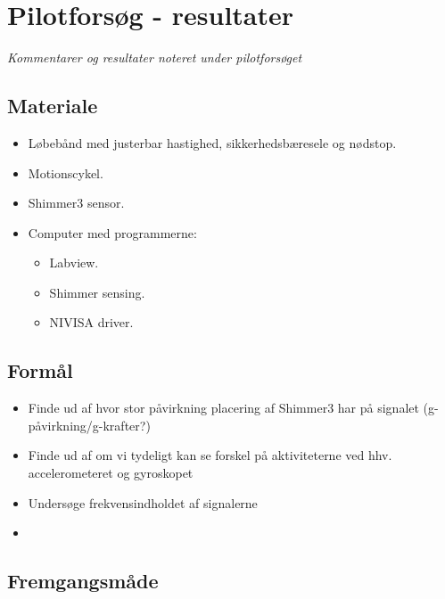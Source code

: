 \section{Pilotforsøg - resultater}\vspace{-.75cm}
\textit{Kommentarer og resultater noteret under pilotforsøget}

\subsection{Materiale}
\begin{itemize}
	\item Løbebånd med justerbar hastighed, sikkerhedsbæresele og nødstop.
	\item Motionscykel.
	\item Shimmer3 sensor.
	\item Computer med programmerne:
	\begin{itemize}
		\item Labview.
		\item Shimmer sensing.
		\item NIVISA driver.
	\end{itemize}
\end{itemize}


\subsection{Formål}

\begin{itemize}
	\item Finde ud af hvor stor påvirkning placering af Shimmer3 har på signalet (g-påvirkning/g-krafter?)
	\item Finde ud af om vi tydeligt kan se forskel på aktiviteterne ved hhv. accelerometeret og gyroskopet
	\item Undersøge frekvensindholdet af signalerne
	\item 
\end{itemize}




\subsection{Fremgangsmåde}

